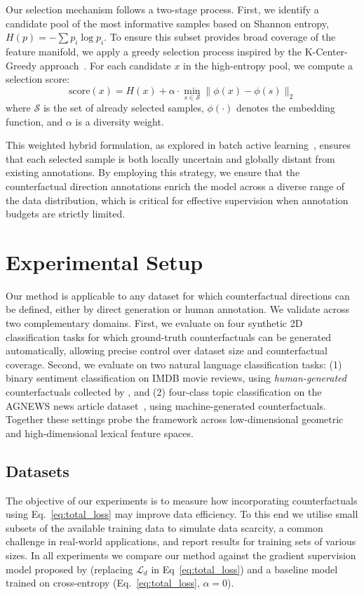 Our selection mechanism follows a two-stage process. First, we identify a candidate pool of the most informative samples based on Shannon entropy, $H(p) = -\sum p_i \log p_i$. To ensure this subset provides broad coverage of the feature manifold, we apply a greedy selection process inspired by the K-Center-Greedy approach~\cite{sener2018activelearning}. For each candidate $x$ in the high-entropy pool, we compute a selection score:
\begin{equation}
    \text{score}(x) = H(x) + \alpha \cdot \min_{s \in \mathcal{S}} \| \phi(x) - \phi(s) \|_2
\end{equation}
where $\mathcal{S}$ is the set of already selected samples, $\phi(\cdot)$ denotes the embedding function, and $\alpha$ is a diversity weight. 

This weighted hybrid formulation, as explored in batch active learning~\cite{citovsky2021batchactivelearningscale}, ensures that each selected sample is both locally uncertain and globally distant from existing annotations. By employing this strategy, we ensure that the counterfactual direction annotations enrich the model across a diverse range of the data distribution, which is critical for effective supervision when annotation budgets are strictly limited.


\section{Experimental Setup}
\label{sec:experimental_setup}
Our method is applicable to any dataset for which counterfactual directions can be defined, either by direct generation or human annotation. We validate across two complementary domains. First, we evaluate on four synthetic 2D classification tasks for which ground-truth counterfactuals can be generated automatically, allowing precise control over dataset size and counterfactual coverage. Second, we evaluate on two natural language classification tasks: (1) binary sentiment classification on IMDB movie reviews, using \emph{human-generated} counterfactuals collected by \citet{Kaushik2020Learning}, and (2) four-class topic classification on the AGNEWS news article dataset~\cite{NIPS2015_250cf8b5}, using machine-generated counterfactuals. Together these settings probe the framework across low-dimensional geometric and high-dimensional lexical feature spaces.


\subsection{Datasets}
The objective of our experiments is to measure how incorporating counterfactuals using Eq.~\ref{eq:total_loss} may improve data efficiency. To this end we utilise small subsets of the available training data to simulate data scarcity, a common challenge in real-world applications, and report results for training sets of various sizes. In all experiments we compare our method against the gradient supervision model proposed by \citet{teney2020learning} (replacing $\mathcal{L}_d$ in Eq~\ref{eq:total_loss}) and a baseline model trained on cross-entropy (Eq.~\ref{eq:total_loss}, $\alpha=0$).


